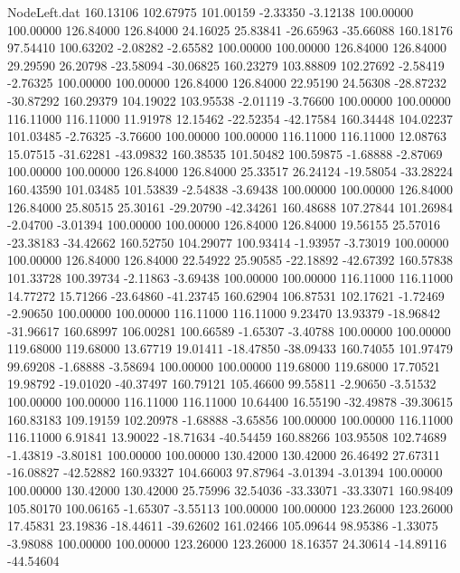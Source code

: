 \begin{filecontents}{NodeLeft.dat}
 160.13106  102.67975  101.00159    -2.33350   -3.12138  100.00000  100.00000  126.84000  126.84000   24.16025   25.83841  -26.65963  -35.66088
 160.18176   97.54410  100.63202    -2.08282   -2.65582  100.00000  100.00000  126.84000  126.84000   29.29590   26.20798  -23.58094  -30.06825
 160.23279  103.88809  102.27692    -2.58419   -2.76325  100.00000  100.00000  126.84000  126.84000   22.95190   24.56308  -28.87232  -30.87292
 160.29379  104.19022  103.95538    -2.01119   -3.76600  100.00000  100.00000  116.11000  116.11000   11.91978   12.15462  -22.52354  -42.17584
 160.34448  104.02237  101.03485    -2.76325   -3.76600  100.00000  100.00000  116.11000  116.11000   12.08763   15.07515  -31.62281  -43.09832
 160.38535  101.50482  100.59875    -1.68888   -2.87069  100.00000  100.00000  126.84000  126.84000   25.33517   26.24124  -19.58054  -33.28224
 160.43590  101.03485  101.53839    -2.54838   -3.69438  100.00000  100.00000  126.84000  126.84000   25.80515   25.30161  -29.20790  -42.34261
 160.48688  107.27844  101.26984    -2.04700   -3.01394  100.00000  100.00000  126.84000  126.84000   19.56155   25.57016  -23.38183  -34.42662
 160.52750  104.29077  100.93414    -1.93957   -3.73019  100.00000  100.00000  126.84000  126.84000   22.54922   25.90585  -22.18892  -42.67392
 160.57838  101.33728  100.39734    -2.11863   -3.69438  100.00000  100.00000  116.11000  116.11000   14.77272   15.71266  -23.64860  -41.23745
 160.62904  106.87531  102.17621    -1.72469   -2.90650  100.00000  100.00000  116.11000  116.11000    9.23470   13.93379  -18.96842  -31.96617
 160.68997  106.00281  100.66589    -1.65307   -3.40788  100.00000  100.00000  119.68000  119.68000   13.67719   19.01411  -18.47850  -38.09433
 160.74055  101.97479   99.69208    -1.68888   -3.58694  100.00000  100.00000  119.68000  119.68000   17.70521   19.98792  -19.01020  -40.37497
 160.79121  105.46600   99.55811    -2.90650   -3.51532  100.00000  100.00000  116.11000  116.11000   10.64400   16.55190  -32.49878  -39.30615
 160.83183  109.19159  102.20978    -1.68888   -3.65856  100.00000  100.00000  116.11000  116.11000    6.91841   13.90022  -18.71634  -40.54459
 160.88266  103.95508  102.74689    -1.43819   -3.80181  100.00000  100.00000  130.42000  130.42000   26.46492   27.67311  -16.08827  -42.52882
 160.93327  104.66003   97.87964    -3.01394   -3.01394  100.00000  100.00000  130.42000  130.42000   25.75996   32.54036  -33.33071  -33.33071
 160.98409  105.80170  100.06165    -1.65307   -3.55113  100.00000  100.00000  123.26000  123.26000   17.45831   23.19836  -18.44611  -39.62602
 161.02466  105.09644   98.95386    -1.33075   -3.98088  100.00000  100.00000  123.26000  123.26000   18.16357   24.30614  -14.89116  -44.54604

\end{filecontents}
